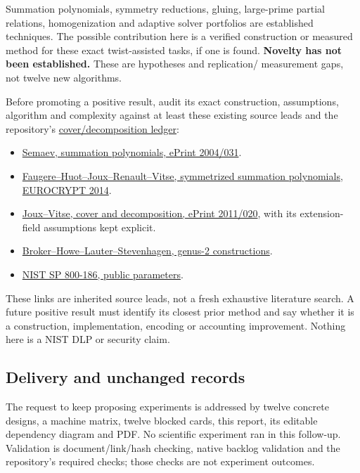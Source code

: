 \documentclass[
  10pt,
]{article}
\providecommand{\tightlist}{%
  \setlength{\itemsep}{0pt}\setlength{\parskip}{0pt}}
\begin{document}
Summation polynomials, symmetry reductions, gluing, large-prime partial
relations, homogenization and adaptive solver portfolios are established
techniques. The possible contribution here is a verified construction or
measured method for these exact twist-assisted tasks, if one is found.
\textbf{Novelty has not been established.} These are hypotheses and
replication/ measurement gaps, not twelve new algorithms.

Before promoting a positive result, audit its exact construction,
assumptions, algorithm and complexity against at least these existing
source leads and the repository's
\href{../../notes/index-calculus/RESEARCH_COVER_DECOMPOSITION_LEDGER.md}{cover/decomposition
ledger}:

\begin{itemize}
\tightlist
\item
  \href{https://eprint.iacr.org/2004/031}{Semaev, summation polynomials,
  ePrint 2004/031}.
\item
  \href{https://www.iacr.org/archive/eurocrypt2014/84410158/84410158.pdf}{Faugere--Huot--Joux--Renault--Vitse,
  symmetrized summation polynomials, EUROCRYPT 2014}.
\item
  \href{https://eprint.iacr.org/2011/020}{Joux--Vitse, cover and
  decomposition, ePrint 2011/020}, with its extension-field assumptions
  kept explicit.
\item
  \href{https://arxiv.org/abs/1403.6911}{Broker--Howe--Lauter--Stevenhagen,
  genus-2 constructions}.
\item
  \href{https://nvlpubs.nist.gov/nistpubs/SpecialPublications/NIST.SP.800-186.pdf}{NIST
  SP 800-186, public parameters}.
\end{itemize}

These links are inherited source leads, not a fresh exhaustive
literature search. A future positive result must identify its closest
prior method and say whether it is a construction, implementation,
encoding or accounting improvement. Nothing here is a NIST DLP or
security claim.

\subsection{Delivery and unchanged
records}\label{delivery-and-unchanged-records}

The request to keep proposing experiments is addressed by twelve
concrete designs, a machine matrix, twelve blocked cards, this report,
its editable dependency diagram and PDF. No scientific experiment ran in
this follow-up. Validation is document/link/hash checking, native
backlog validation and the repository's required checks; those checks
are not experiment outcomes.
\end{document}
